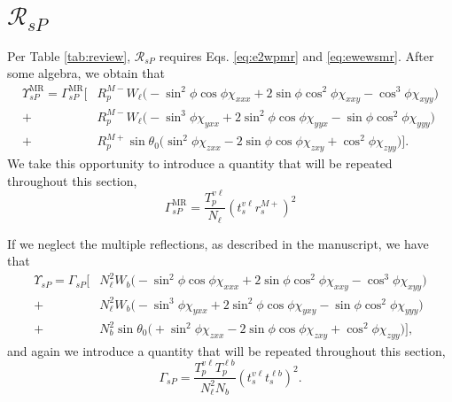 

\section{\texorpdfstring{$\mathcal{R}_{sP}$}{RsP}}

Per Table \ref{tab:review}, $\mathcal{R}_{sP}$ requires Eqs. \eqref{eq:e2wpmr}
and \eqref{eq:ewewsmr}. After some algebra, we obtain that
\begin{equation}\label{eq:rspfullmr}
\begin{split}
\Upsilon^{\mathrm{MR}}_{sP} =
\Gamma^{\mathrm{MR}}_{sP}
\bigg[
&R^{M-}_{p}W_{\ell}
\big(
-\sin^{2}\phi\cos\phi\chi_{xxx}
+ 2\sin\phi\cos^{2}\phi\chi_{xxy}
- \cos^{3}\phi\chi_{xyy}
\big)\\
+&R^{M-}_{p}W_{\ell}
\big(
- \sin^{3}\phi\chi_{yxx}
+ 2\sin^{2}\phi\cos\phi \chi_{yyx}
- \sin\phi\cos^{2}\phi\chi_{yyy}
\big)\\
+&R^{M+}_{p}\sin\theta_{0}
\big(
\sin^{2}\phi\chi_{zxx}
- 2\sin\phi\cos\phi\chi_{zxy}
+ \cos^{2}\phi\chi_{zyy}
\big)
\bigg].
\end{split}
\end{equation}
We take this opportunity to introduce a quantity that will be repeated
throughout this section,
\begin{equation}\label{eq:gammaspmr}
\Gamma^{\mathrm{MR}}_{sP} =
\frac{T^{v\ell}_{p}}{N_{\ell}}
\left(t^{v\ell}_{s}r^{M+}_{s}\right)^{2}
\end{equation}

If we neglect the multiple reflections, as described in the manuscript, we have
that
\begin{equation}\label{eq:rspfull}
\begin{split}
\Upsilon_{sP} =
\Gamma_{sP}
\bigg[
&N^{2}_{\ell}W_{b}\big(
- \sin^{2}\phi\cos\phi\chi_{xxx}
+ 2\sin\phi\cos^{2}\phi\chi_{xxy}
- \cos^{3}\phi\chi_{xyy}
  \big)\\
+&N^{2}_{\ell}W_{b}\big(
- \sin^{3}\phi\chi_{yxx}
+ 2\sin^{2}\phi\cos\phi\chi_{yxy}
- \sin\phi\cos^{2}\phi\chi_{yyy}
  \big)\\
+&N^{2}_{b}\sin\theta_{0}\big(
+ \sin^{2}\phi\chi_{zxx}
- 2\sin\phi\cos\phi\chi_{zxy}
+ \cos^{2}\phi\chi_{zyy}
  \big)
\bigg],
\end{split}
\end{equation}
and again we introduce a quantity that will be repeated throughout this section,
\begin{equation}\label{eq:gammasp}
\Gamma_{sP} =
\frac{T^{v\ell}_{p}T^{\ell b}_{p}}{N^{2}_{\ell}N_{b}}
\left(t^{v\ell}_{s}t^{\ell b}_{s}\right)^{2}.
\end{equation}


